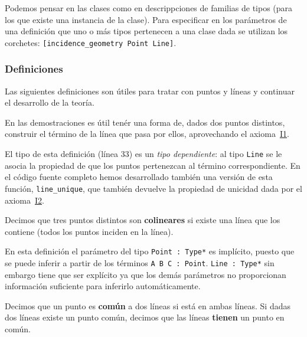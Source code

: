 Podemos pensar en las clases como en descrippciones de familias de tipos (para
los que existe una instancia de la clase). Para especificar en los
parámetros de una definición que uno o más tipos pertenecen a una clase dada se
utilizan los corchetes: \lstinline{[incidence_geometry Point Line]}.

\subsubsection{Definiciones}

Las siguientes definiciones son útiles para tratar con puntos y líneas y
continuar el desarrollo de la teoría.

En las demostraciones es útil tenér una forma de, dados dos puntos distintos,
construir el término de la línea que pasa por ellos, aprovechando el
axioma~\hyperref[ax:I1]{I1}.


El tipo de esta definición (línea 33) es un \textit{tipo dependiente}: al tipo
\lstinline{Line} se le asocia la propiedad de que los puntos pertenezcan al
término correspondiente. En el código fuente completo hemos desarrollado también
una versión de esta función, \lstinline{line_unique}, que también devuelve la
propiedad de unicidad dada por el axioma~\hyperref[ax:I2]{I2}.

\begin{defin*}[Colinearidad]
	Decimos que tres puntos distintos son \textbf{colineares} si existe una
	línea que los contiene (todos los puntos inciden en la línea).
\end{defin*}


En esta definición el parámetro del tipo \lstinline{Point : Type*} es implícito,
puesto que se puede inferir a partir de los términos \lstinline{A B C : Point}.
\lstinline{Line : Type*} sin embargo tiene que ser explícito ya que los demás
parámetros no proporcionan información suficiente para inferirlo
automáticamente.

\begin{defin*}
	Decimos que un punto es \textbf{común} a dos líneas si está en ambas líneas.
	Si dadas dos líneas existe un punto común, decimos que las líneas
	\textbf{tienen} un punto en común.
\end{defin*}


